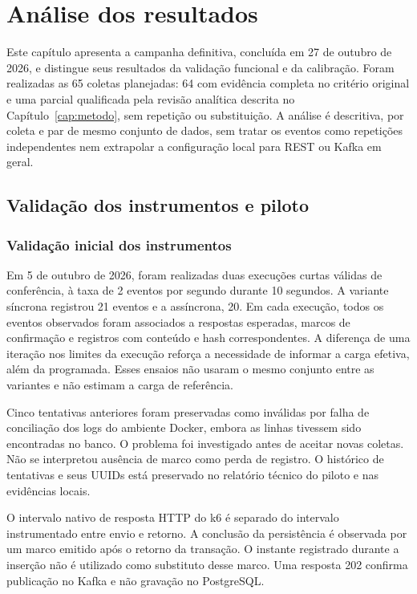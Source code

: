 \chapter{Análise dos resultados}
\label{cap:resultados}

Este capítulo apresenta a campanha definitiva, concluída em 27 de outubro de 2026, e distingue seus resultados da validação funcional e da calibração. Foram realizadas as 65 coletas planejadas: 64 com evidência completa no critério original e uma parcial qualificada pela revisão analítica descrita no Capítulo~\ref{cap:metodo}, sem repetição ou substituição. A análise é descritiva, por coleta e par de mesmo conjunto de dados, sem tratar os eventos como repetições independentes nem extrapolar a configuração local para REST ou Kafka em geral.

\section{Validação dos instrumentos e piloto}

\subsection{Validação inicial dos instrumentos}

Em 5 de outubro de 2026, foram realizadas duas execuções curtas válidas de conferência, à taxa de 2 eventos por segundo durante 10 segundos. A variante síncrona registrou 21 eventos e a assíncrona, 20. Em cada execução, todos os eventos observados foram associados a respostas esperadas, marcos de confirmação e registros com conteúdo e hash correspondentes. A diferença de uma iteração nos limites da execução reforça a necessidade de informar a carga efetiva, além da programada. Esses ensaios não usaram o mesmo conjunto entre as variantes e não estimam a carga de referência.

Cinco tentativas anteriores foram preservadas como inválidas por falha de conciliação dos logs do ambiente Docker, embora as linhas tivessem sido encontradas no banco. O problema foi investigado antes de aceitar novas coletas. Não se interpretou ausência de marco como perda de registro. O histórico de tentativas e seus UUIDs está preservado no relatório técnico do piloto e nas evidências locais.

O intervalo nativo de resposta HTTP do k6 é separado do intervalo instrumentado entre envio e retorno. A conclusão da persistência é observada por um marco emitido após o retorno da transação. O instante registrado durante a inserção não é utilizado como substituto desse marco. Uma resposta 202 confirma publicação no Kafka e não gravação no PostgreSQL.


